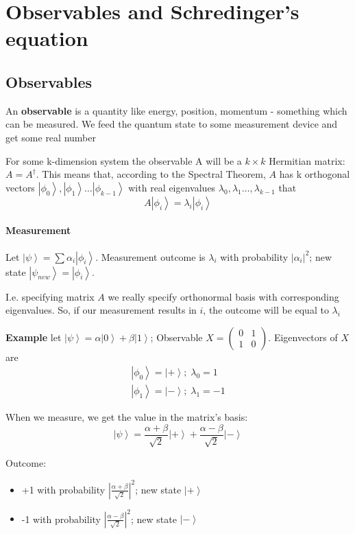 \documentclass{scrartcl}
\newcommand{\ket}[1]{\left| #1 \right>} %
\begin{document}
\section{Observables and Schredinger's equation}
\label{sec:8}

\subsection{Observables}
\label{sec:7-1}

An {\bf observable } is a quantity like energy, position, momentum - something
which can be measured. We feed the quantum state to some measurement device and
get some real number

For some k-dimension system the observable A will be a $k \times k$ Hermitian
matrix: $A = A^\dag$. This means that, according to the Spectral Theorem, $A$
has k orthogonal vectors $\ket{\phi_0}, \ket{\phi_1} \dots \ket{\phi_{k-1}}$
with real eigenvalues $\lambda_0, \lambda_1 \dots, \lambda_{k-1}$ that
$$A \ket{\phi_i} = \lambda_i \ket{\phi_i}$$

\paragraph{Measurement}

Let $\ket\psi = \sum \alpha_i\ket{\phi_i}$. Measurement outcome is $\lambda_i$
with probability $|\alpha_i|^2$; new state $\ket{\psi_{new}} = \ket{\phi_i}$.

I.e. specifying matrix $A$ we really specify orthonormal basis with
corresponding eigenvalues. So, if our measurement results in $i$, the outcome
will be equal to $\lambda_i$

{\bf Example} let $\ket\psi = \alpha \ket0 + \beta\ket1$; Observable $X
= \begin{pmatrix} 0 & 1 \\ 1 & 0 \end{pmatrix}$. Eigenvectors of $X$ are
\begin{gather*} \ket{\phi_0} = \ket+; \; \lambda_0 = 1 \\ \ket{\phi_1} = \ket-;
  \; \lambda_1 = -1 \end{gather*}

When we measure, we get the value in the matrix's basis: $$\ket\psi =
\frac{\alpha + \beta}{\sqrt2} \ket+ + \frac{\alpha-\beta}{\sqrt2} \ket-$$

Outcome:
\begin{itemize}
\item +1 with probability $\left| \frac{\alpha + \beta}{\sqrt2}\right| ^2$; new
  state $\ket+$
\item -1 with probability $\left| \frac{\alpha - \beta}{\sqrt2}\right| ^2$; new
  state $\ket-$
\end{itemize}
\end{document}
